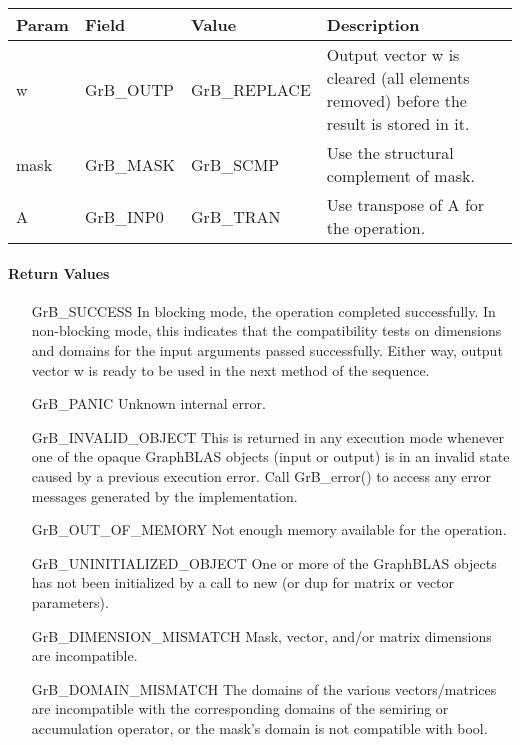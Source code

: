 \begin{itemize}[leftmargin=1.1in]
    \begin{tabular}{lllp{2.5in}}
        Param & Field  & Value & Description \\
        \hline
        {\sf w}    & {\sf GrB\_OUTP} & {\sf GrB\_REPLACE} & Output vector {\sf w}
        is cleared (all elements removed) before the result is stored in it.\\

        {\sf mask} & {\sf GrB\_MASK} & {\sf GrB\_SCMP}   & Use the structural
        complement of {\sf mask}. \\

        {\sf A}    & {\sf GrB\_INP0} & {\sf GrB\_TRAN}   & Use transpose of {\sf A}
        for the operation. \\
    \end{tabular}
\end{itemize}

\paragraph{Return Values}

\begin{itemize}[leftmargin=2.1in]
    \item[{\sf GrB\_SUCCESS}]         In blocking mode, the operation completed
    successfully. In non-blocking mode, this indicates that the compatibility 
    tests on dimensions and domains for the input arguments passed successfully. 
    Either way, output vector {\sf w} is ready to be used in the next method of 
    the sequence.

    \item[{\sf GrB\_PANIC}]           Unknown internal error.

    \item[{\sf GrB\_INVALID\_OBJECT}] This is returned in any execution mode 
    whenever one of the opaque GraphBLAS objects (input or output) is in an invalid 
    state caused by a previous execution error.  Call {\sf GrB\_error()} to access 
    any error messages generated by the implementation.

    \item[{\sf GrB\_OUT\_OF\_MEMORY}] Not enough memory available for the operation.

    \item[{\sf GrB\_UNINITIALIZED\_OBJECT}] One or more of the GraphBLAS objects 
    has not been initialized by a call to {\sf new} (or {\sf dup} for matrix or
    vector parameters).

    \item[{\sf GrB\_DIMENSION\_MISMATCH}] Mask, vector, and/or matrix 
    dimensions are incompatible.

    \item[{\sf GrB\_DOMAIN\_MISMATCH}]    The domains of the various vectors/matrices are
    incompatible with the corresponding domains of the semiring or
    accumulation operator, or the mask's domain is not compatible with {\sf bool}.
\end{itemize}

